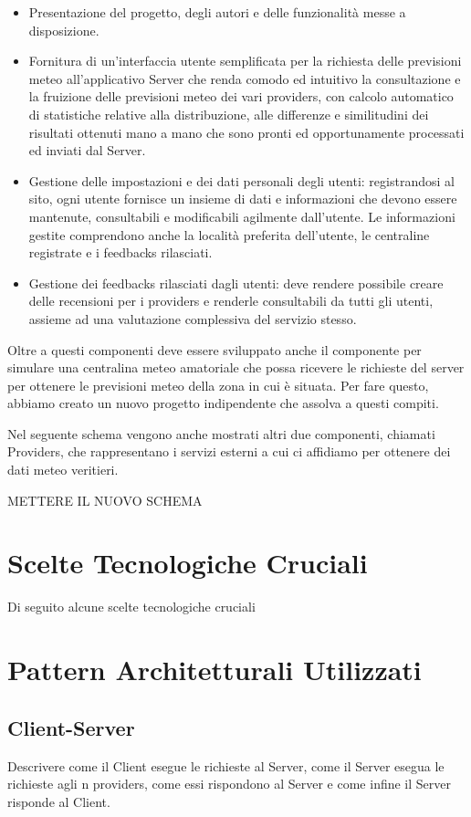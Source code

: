     \begin{itemize}
    
        \item Presentazione del progetto, degli autori e delle funzionalità messe a disposizione.
        
        \item Fornitura di un'interfaccia utente semplificata per la richiesta delle previsioni meteo all'applicativo Server che renda comodo ed intuitivo la consultazione e la fruizione delle previsioni meteo dei vari providers, con calcolo automatico di statistiche relative alla distribuzione, alle differenze e similitudini dei risultati ottenuti mano a mano che sono pronti ed opportunamente processati ed inviati dal Server.
        
        \item Gestione delle impostazioni e dei dati personali degli utenti: registrandosi al sito, ogni utente fornisce un insieme di dati e informazioni che devono essere mantenute, consultabili e modificabili agilmente dall'utente. Le informazioni gestite comprendono anche la località preferita dell'utente, le centraline registrate e i feedbacks rilasciati.
        
        \item Gestione dei feedbacks rilasciati dagli utenti: deve rendere possibile creare delle recensioni per i providers e renderle consultabili da tutti gli utenti, assieme ad una valutazione complessiva del servizio stesso.
    
    \end{itemize}
    
    \par Oltre a questi componenti deve essere sviluppato anche il componente per simulare una centralina meteo amatoriale che possa ricevere le richieste del server per ottenere le previsioni meteo della zona in cui è situata. Per fare questo, abbiamo creato un nuovo progetto indipendente che assolva a questi compiti.
    
    \par Nel seguente schema vengono anche mostrati altri due componenti, chiamati Providers, che rappresentano i servizi esterni a cui ci affidiamo per ottenere dei dati meteo veritieri.
    
    METTERE IL NUOVO SCHEMA
    
    \section{Scelte Tecnologiche Cruciali}
    Di seguito alcune scelte tecnologiche cruciali

    \section{Pattern Architetturali Utilizzati}
        \subsection{Client-Server}
        Descrivere come il Client esegue le richieste al Server, come il Server esegua le richieste agli n providers, come essi rispondono al Server e come infine il Server risponde al Client.
    